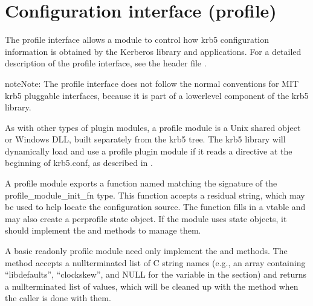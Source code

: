 \documentclass[letterpaper,10pt,english]{sphinxmanual}
\begin{document}
\section{Configuration interface (profile)}
\label{\detokenize{plugindev/profile:configuration-interface-profile}}\label{\detokenize{plugindev/profile:profile-plugin}}\label{\detokenize{plugindev/profile::doc}}
\sphinxAtStartPar
The profile interface allows a module to control how krb5
configuration information is obtained by the Kerberos library and
applications.  For a detailed description of the profile interface,
see the header file .

\begin{sphinxadmonition}{note}{Note:}
\sphinxAtStartPar
The profile interface does not follow the normal conventions
for MIT krb5 pluggable interfaces, because it is part of a
lower\sphinxhyphen{}level component of the krb5 library.
\end{sphinxadmonition}

\sphinxAtStartPar
As with other types of plugin modules, a profile module is a Unix
shared object or Windows DLL, built separately from the krb5 tree.
The krb5 library will dynamically load and use a profile plugin module
if it reads a  directive at the beginning of krb5.conf, as
described in .

\sphinxAtStartPar
A profile module exports a function named 
matching the signature of the profile\_module\_init\_fn type.  This
function accepts a residual string, which may be used to help locate
the configuration source.  The function fills in a vtable and may also
create a per\sphinxhyphen{}profile state object.  If the module uses state objects,
it should implement the  and  methods to manage
them.

\sphinxAtStartPar
A basic read\sphinxhyphen{}only profile module need only implement the
 and  methods.  The  method
accepts a null\sphinxhyphen{}terminated list of C string names (e.g., an array
containing “libdefaults”, “clockskew”, and NULL for the 
variable in the  section) and returns a
null\sphinxhyphen{}terminated list of values, which will be cleaned up with the
 method when the caller is done with them.
\end{document}
